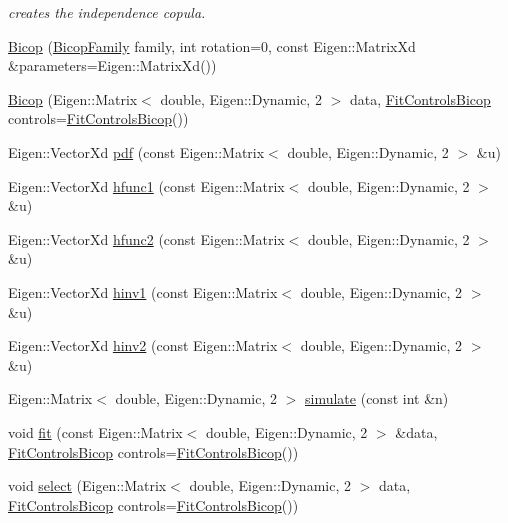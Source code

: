 \begin{DoxyCompactItemize}
\begin{DoxyCompactList}\small\item\em creates the independence copula. \end{DoxyCompactList}\item 
\hyperlink{classvinecopulib_1_1_bicop_ab27f789e001e30f2fed7f9ecefdeffb0}{Bicop} (\hyperlink{namespacevinecopulib_a42e95cc06d33896199caab0c11ad44f3}{Bicop\+Family} family, int rotation=0, const Eigen\+::\+Matrix\+Xd \&parameters=Eigen\+::\+Matrix\+Xd())
\item 
\hyperlink{classvinecopulib_1_1_bicop_afc8b465d9e02a3df1c25f7c1e7ac9240}{Bicop} (Eigen\+::\+Matrix$<$ double, Eigen\+::\+Dynamic, 2 $>$ data, \hyperlink{classvinecopulib_1_1_fit_controls_bicop}{Fit\+Controls\+Bicop} controls=\hyperlink{classvinecopulib_1_1_fit_controls_bicop}{Fit\+Controls\+Bicop}())
\item 
Eigen\+::\+Vector\+Xd \hyperlink{classvinecopulib_1_1_bicop_a83dc7214e4bb1bfe59285ca05407d646}{pdf} (const Eigen\+::\+Matrix$<$ double, Eigen\+::\+Dynamic, 2 $>$ \&u)
\item 
Eigen\+::\+Vector\+Xd \hyperlink{classvinecopulib_1_1_bicop_a130fda62cd61c7acdef5db75fffdd89e}{hfunc1} (const Eigen\+::\+Matrix$<$ double, Eigen\+::\+Dynamic, 2 $>$ \&u)
\item 
Eigen\+::\+Vector\+Xd \hyperlink{classvinecopulib_1_1_bicop_a4c9b50f99797ec374f5057cc54db2bd8}{hfunc2} (const Eigen\+::\+Matrix$<$ double, Eigen\+::\+Dynamic, 2 $>$ \&u)
\item 
Eigen\+::\+Vector\+Xd \hyperlink{classvinecopulib_1_1_bicop_a3cc8b161ec6efdb3b34d2efa9185bf44}{hinv1} (const Eigen\+::\+Matrix$<$ double, Eigen\+::\+Dynamic, 2 $>$ \&u)
\item 
Eigen\+::\+Vector\+Xd \hyperlink{classvinecopulib_1_1_bicop_a3e33ec227b6b7182e327399201cad382}{hinv2} (const Eigen\+::\+Matrix$<$ double, Eigen\+::\+Dynamic, 2 $>$ \&u)
\item 
Eigen\+::\+Matrix$<$ double, Eigen\+::\+Dynamic, 2 $>$ \hyperlink{classvinecopulib_1_1_bicop_aeb87bea4283dacfa5e609356c020f85d}{simulate} (const int \&n)
\item 
void \hyperlink{classvinecopulib_1_1_bicop_a2d509a8b404a73ef17f04a0678e90a71}{fit} (const Eigen\+::\+Matrix$<$ double, Eigen\+::\+Dynamic, 2 $>$ \&data, \hyperlink{classvinecopulib_1_1_fit_controls_bicop}{Fit\+Controls\+Bicop} controls=\hyperlink{classvinecopulib_1_1_fit_controls_bicop}{Fit\+Controls\+Bicop}())
\item 
void \hyperlink{classvinecopulib_1_1_bicop_af20af5c3ba6565628987b4784e9ac348}{select} (Eigen\+::\+Matrix$<$ double, Eigen\+::\+Dynamic, 2 $>$ data, \hyperlink{classvinecopulib_1_1_fit_controls_bicop}{Fit\+Controls\+Bicop} controls=\hyperlink{classvinecopulib_1_1_fit_controls_bicop}{Fit\+Controls\+Bicop}())

\end{DoxyCompactItemize}
